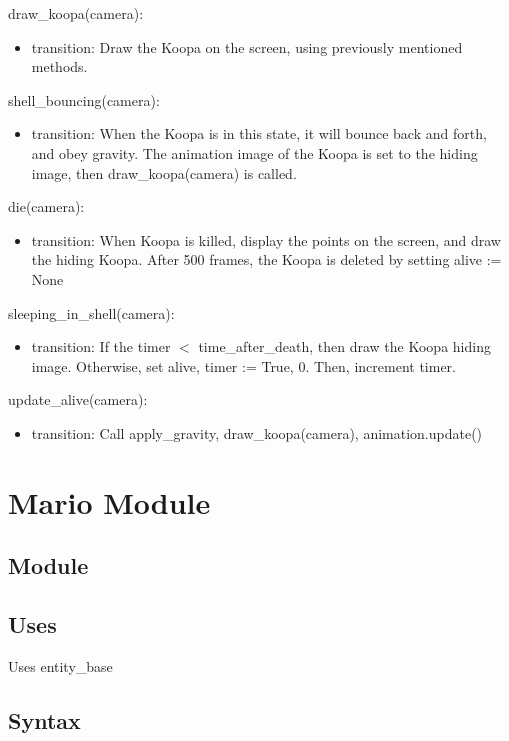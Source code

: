 \documentclass[12pt]{article}
\begin{document}
draw\_koopa(camera):
\begin{itemize}
    \item transition: Draw the Koopa on the screen, using previously mentioned methods.
\end{itemize}

shell\_bouncing(camera):
\begin{itemize}
    \item transition: When the Koopa is in this state, it will bounce back and forth, and obey gravity. The animation image of the Koopa is set to the hiding image, then draw\_koopa(camera) is called.
\end{itemize}

die(camera):
\begin{itemize}
    \item transition: When Koopa is killed, display the points on the screen, and draw the hiding Koopa. After 500 frames, the Koopa is deleted by setting alive := None
\end{itemize}

sleeping\_in\_shell(camera):
\begin{itemize}
    \item transition: If the timer $\lt$ time\_after\_death, then draw the Koopa hiding image. Otherwise, set alive, timer := True, 0. Then, increment timer.
\end{itemize}

update\_alive(camera):
\begin{itemize}
    \item transition: Call apply\_gravity, draw\_koopa(camera), animation.update()
\end{itemize}

\newpage

\section*{Mario Module}
\subsection*{Module}
\subsection*{Uses}
Uses entity\_base
\subsection*{Syntax}
\end{document}
